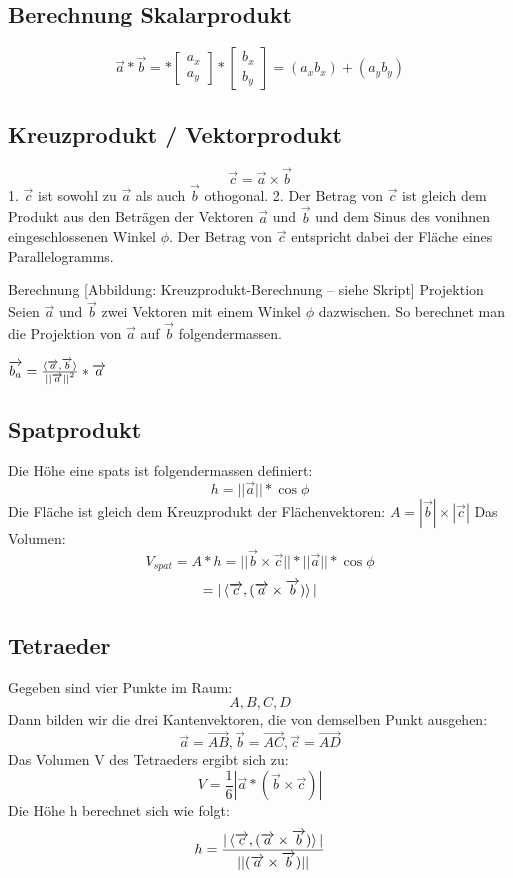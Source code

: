 \documentclass[10pt,a4paper,twocolumn]{article}
\newcommand{\detail}[1]{{\small\color{detail}#1}}
\begin{document}
	\subsection{Berechnung Skalarprodukt}
	$$\overrightarrow{a} * \overrightarrow{b} = *\begin{bmatrix}a_x\\a_y\end{bmatrix} *\begin{bmatrix}b_x\\b_y\end{bmatrix} =
	(a_x b_x) + (a_yb_y)$$
	\subsection{Kreuzprodukt / Vektorprodukt}
	$$\overrightarrow{c}=\overrightarrow{a} \times \overrightarrow{b} $$
	1. $\overrightarrow{c}$ ist sowohl zu $\overrightarrow{a}$ als auch $\overrightarrow{b}$ othogonal.
	2. Der Betrag von $\overrightarrow{c}$ ist gleich dem Produkt aus den Beträgen der Vektoren $\overrightarrow{a}$ und $\overrightarrow{b}$ und dem Sinus des vonihnen eingeschlossenen Winkel $\phi$. Der Betrag von $\overrightarrow{c}$ entspricht dabei der Fläche eines Parallelogramms.
	
	Berechnung
	\detail{[Abbildung: Kreuzprodukt-Berechnung -- siehe Skript]}
	Projektion
	Seien $\overrightarrow{a}$ und $\overrightarrow{b}$ zwei  Vektoren  mit einem Winkel $\phi$ dazwischen. So berechnet man die Projektion von  $\overrightarrow{a}$ auf $\overrightarrow{b}$ folgendermassen.
	
	$\overrightarrow{b_a}=\frac{\braket{\overrightarrow{a},\overrightarrow{b}}}{{||\overrightarrow{a}||}^2}*\overrightarrow{a}$
	\subsection{Spatprodukt}
	Die Höhe eine spats ist folgendermassen definiert:
	$$h=||\overrightarrow{a}||*\cos{\phi}$$
	Die Fläche ist gleich dem Kreuzprodukt der Flächenvektoren:
	$A=|\overrightarrow{b}| \times |\overrightarrow{c}|$
	Das Volumen:
	$$V_{spat}=A*h=||\overrightarrow{b} \times \overrightarrow{c}||*||\overrightarrow{a}||*\cos{\phi}$$
	$$=|\braket{\overrightarrow{c},(\overrightarrow{a} \times \overrightarrow{b})}|$$
	\subsection{Tetraeder}
	Gegeben sind vier Punkte im Raum:
	$$A,B,C,D$$
	Dann bilden wir die drei Kantenvektoren, die von demselben Punkt ausgehen:
	$$\overrightarrow{a}=\overrightarrow{AB}, \overrightarrow{b}=\overrightarrow{AC}, \overrightarrow{c}=\overrightarrow{AD}$$
	Das Volumen V des Tetraeders ergibt sich zu:
	$$V=\frac{1}{6}\left| \overrightarrow{a}*(\overrightarrow{b}\times\overrightarrow{c})\right|$$
	Die Höhe h berechnet sich wie folgt:
	$$h = \frac{|\braket{\overrightarrow{c},(\overrightarrow{a} \times \overrightarrow{b})}|}{||(\overrightarrow{a} \times \overrightarrow{b})||}$$
\end{document}

